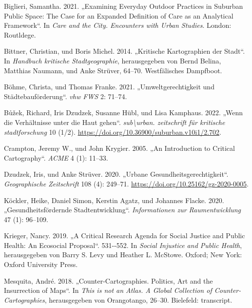 \documentclass[
  ngerman,
]{article}
\newlength{\cslhangindent}
\newlength{\cslentryspacingunit} %
\newenvironment{CSLReferences}[2] %
 {%
  \setlength{\parindent}{0pt}
  \ifodd #1
  \let\oldpar\par
  \def\par{\hangindent=\cslhangindent\oldpar}
  \fi
  \setlength{\parskip}{#2\cslentryspacingunit}
 }%
 {}
\begin{document}
\hypertarget{refs}{}
\begin{CSLReferences}{1}{0}
\leavevmode{}%
Biglieri, Samantha. 2021. {„Examining Everyday Outdoor Practices in Suburban Public Space: The Case for an Expanded Definition of Care as an Analytical Framework``}. In \emph{Care and the City. Encounters with Urban Studies}. London: Routldege.

\leavevmode{}%
Bittner, Christian, und Boris Michel. 2014. {„Kritische Kartographien der Stadt``}. In \emph{Handbuch kritische Stadtgeographie}, herausgegeben von Bernd Belina, Matthias Naumann, und Anke Strüver, 64--70. {Westf{ä}lisches Dampfboot}.

\leavevmode{}%
Böhme, Christa, und Thomas Franke. 2021. {„Umweltgerechtigkeit und St{ä}dtebauf{ö}rderung``}. \emph{vhw FWS} 2: 71--74.

\leavevmode{}%
Bůžek, Richard, Iris Dzudzek, Susanne Hübl, und Lisa Kamphaus. 2022. {„Wenn die Verh{ä}ltnisse unter die Haut gehen``}. \emph{sub{\textbackslash{}}urban. zeitschrift f{ü}r kritische stadtforschung} 10 (1/2). \url{https://doi.org/10.36900/suburban.v10i1/2.702}.

\leavevmode{}%
Crampton, Jeremy W., und John Krygier. 2005. {„An Introduction to Critical Cartography``}. \emph{ACME} 4 (1): 11--33.

\leavevmode{}%
Dzudzek, Iris, und Anke Strüver. 2020. {„Urbane Gesundheitsgerechtigkeit``}. \emph{Geographische Zeitschrift} 108 (4): 249--71. \url{https://doi.org/10.25162/gz-2020-0005}.

\leavevmode{}%
Köckler, Heike, Daniel Simon, Kerstin Agatz, und Johannes Flacke. 2020. {„Gesundheitsf{ö}rdernde Stadtentwicklung``}. \emph{Informationen zur Raumentwicklung} 47 (1): 96--109.

\leavevmode{}%
Krieger, Nancy. 2019. {„A Critical Research Agenda for Social Justice and Public Health: An Ecosocial Proposal``}. 531-\/-552. In \emph{Social Injustice and Public Health}, herausgegeben von Barry S. Levy und Heather L. McStowe. Oxford; New York: Oxford University Press.

\leavevmode{}%
Mesquita, André. 2018. {„Counter-Cartographies. Politics, Art and the Insurrection of Maps``}. In \emph{This is not an Atlas. A Global Collection of Counter-Cartographies}, herausgegeben von Orangotango, 26--30. Bielefeld: transcript.


\end{CSLReferences}
\end{document}
